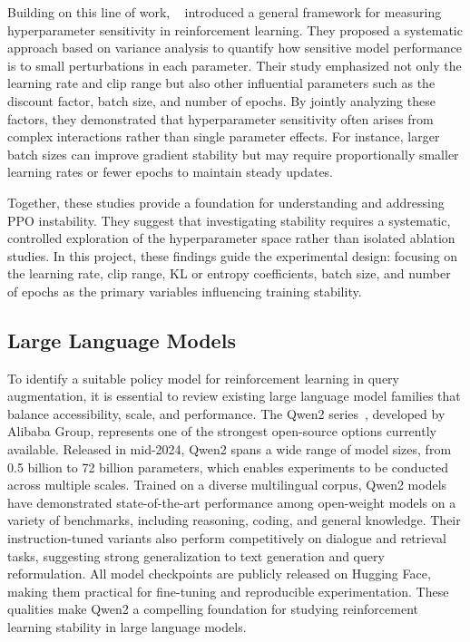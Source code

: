 Building on this line of work, \citeauthor{adkins2024method}~\cite{adkins2024method} introduced a general framework for measuring hyperparameter sensitivity in reinforcement learning. They proposed a systematic approach based on variance analysis to quantify how sensitive model performance is to small perturbations in each parameter. Their study emphasized not only the learning rate and clip range but also other influential parameters such as the discount factor, batch size, and number of epochs. By jointly analyzing these factors, they demonstrated that hyperparameter sensitivity often arises from complex interactions rather than single parameter effects. For instance, larger batch sizes can improve gradient stability but may require proportionally smaller learning rates or fewer epochs to maintain steady updates.

Together, these studies provide a foundation for understanding and addressing PPO instability. They suggest that investigating stability requires a systematic, controlled exploration of the hyperparameter space rather than isolated ablation studies. In this project, these findings guide the experimental design: focusing on the learning rate, clip range, KL or entropy coefficients, batch size, and number of epochs as the primary variables influencing training stability.

\subsection{Large Language Models}
To identify a suitable policy model for reinforcement learning in query augmentation, it is essential to review existing large language model families that balance accessibility, scale, and performance. The Qwen2 series~\cite{team2024qwen2}, developed by Alibaba Group, represents one of the strongest open-source options currently available. Released in mid-2024, Qwen2 spans a wide range of model sizes, from 0.5 billion to 72 billion parameters, which enables experiments to be conducted across multiple scales. Trained on a diverse multilingual corpus, Qwen2 models have demonstrated state-of-the-art performance among open-weight models on a variety of benchmarks, including reasoning, coding, and general knowledge. Their instruction-tuned variants also perform competitively on dialogue and retrieval tasks, suggesting strong generalization to text generation and query reformulation. All model checkpoints are publicly released on Hugging Face, making them practical for fine-tuning and reproducible experimentation. These qualities make Qwen2 a compelling foundation for studying reinforcement learning stability in large language models.

